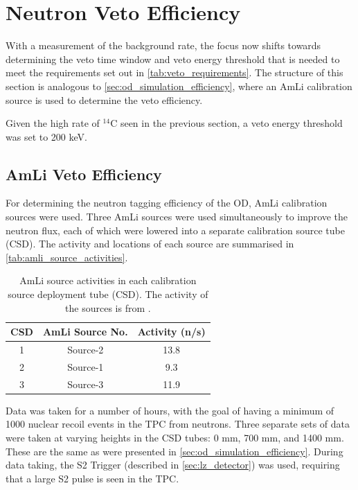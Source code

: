 \section{Neutron Veto Efficiency}
\label{sec:od_analysis_veto_efficiency}
\par
With a measurement of the background rate, the focus now shifts towards determining the veto time window and veto energy threshold that is needed to meet the requirements set out in \autoref{tab:veto_requirements}.
The structure of this section is analogous to \autoref{sec:od_simulation_efficiency}, where an AmLi calibration source is used to determine the veto efficiency.
\par
Given the high rate of ${}^{14}$C seen in the previous section, a veto energy threshold was set to 200 keV.

\subsection{AmLi Veto Efficiency}
\par
For determining the neutron tagging efficiency of the OD, AmLi calibration sources were used.
Three AmLi sources were used simultaneously to improve the neutron flux, each of which were lowered into a separate calibration source tube (CSD).
The activity and locations of each source are summarised in \autoref{tab:amli_source_activities}.

\begin{table}[]
    \centering
    \begin{tabular}{c|c|c}
        CSD & AmLi Source No. & Activity (n/s) \\ \hline
        1   & Source-2        & 13.8           \\
        2   & Source-1        & 9.3            \\ 
        3   & Source-3        & 11.9                
    \end{tabular}
    \caption{AmLi source activities in each calibration source deployment tube (CSD).
             The activity of the sources is from \cite{LZ_TechnicalDesignReview_ref}.}
    \label{tab:amli_source_activities}
\end{table}

\par
Data was taken for a number of hours, with the goal of having a minimum of 1000 nuclear recoil events in the TPC from neutrons.
Three separate sets of data were taken at varying heights in the CSD tubes: 0 mm, 700 mm, and 1400 mm.
These are the same as were presented in \autoref{sec:od_simulation_efficiency}.
During data taking, the S2 Trigger (described in \autoref{sec:lz_detector}) was used, requiring that a large S2 pulse is seen in the TPC.

